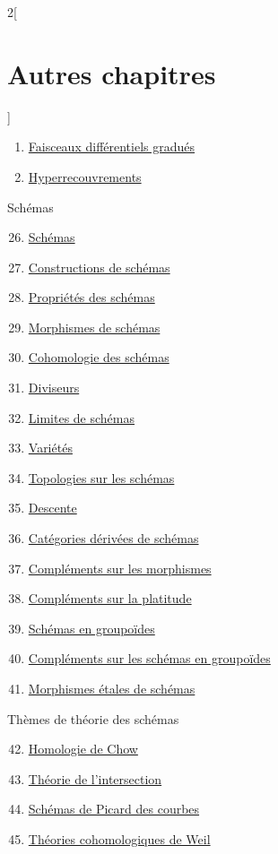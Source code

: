\begin{multicols}{2}[\section{Autres chapitres}]
\begin{enumerate}
\item \hyperref[sdga-section-phantom]{Faisceaux différentiels gradués}
\item \hyperref[hypercovering-section-phantom]{Hyperrecouvrements}
\end{enumerate}
Schémas
\begin{enumerate}
\setcounter{enumi}{25}
\item \hyperref[schemes-section-phantom]{Schémas}
\item \hyperref[constructions-section-phantom]{Constructions de schémas}
\item \hyperref[properties-section-phantom]{Propriétés des schémas}
\item \hyperref[morphisms-section-phantom]{Morphismes de schémas}
\item \hyperref[coherent-section-phantom]{Cohomologie des schémas}
\item \hyperref[divisors-section-phantom]{Diviseurs}
\item \hyperref[limits-section-phantom]{Limites de schémas}
\item \hyperref[varieties-section-phantom]{Variétés}
\item \hyperref[topologies-section-phantom]{Topologies sur les schémas}
\item \hyperref[descent-section-phantom]{Descente}
\item \hyperref[perfect-section-phantom]{Catégories dérivées de schémas}
\item \hyperref[more-morphisms-section-phantom]{Compléments sur les morphismes}
\item \hyperref[flat-section-phantom]{Compléments sur la platitude}
\item \hyperref[groupoids-section-phantom]{Schémas en groupoïdes}
\item \hyperref[more-groupoids-section-phantom]{Compléments sur les schémas en groupoïdes}
\item \hyperref[etale-section-phantom]{Morphismes étales de schémas}
\end{enumerate}
Thèmes de théorie des schémas
\begin{enumerate}
\setcounter{enumi}{41}
\item \hyperref[chow-section-phantom]{Homologie de Chow}
\item \hyperref[intersection-section-phantom]{Théorie de l'intersection}
\item \hyperref[pic-section-phantom]{Schémas de Picard des courbes}
\item \hyperref[weil-section-phantom]{Théories cohomologiques de Weil}

\end{enumerate}
\end{multicols}
